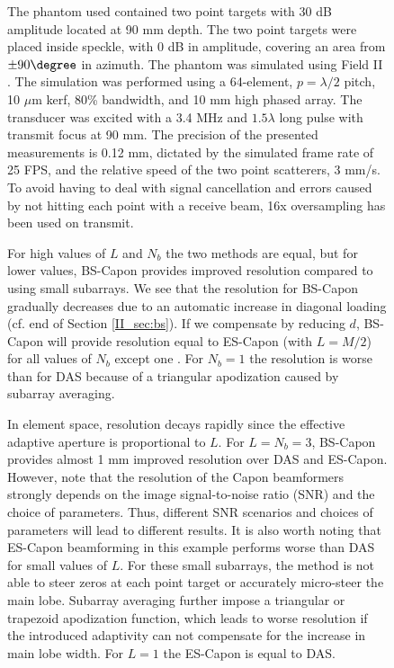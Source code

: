 \begin{figure}[!t]
The phantom used contained two point targets with 30 dB amplitude located at 90 mm depth. The two point targets were placed inside speckle, with 0 dB in amplitude, covering an area from $\pm90\degree$ in azimuth. The phantom was simulated using Field II \cite{Jensen1992, Jensen1996}. The simulation was performed using a 64-element, $p=\lambda/2$ pitch, 10 $\mu$m kerf, 80\% bandwidth, and 10 mm high phased array. The transducer was excited with a 3.4 MHz and $1.5\lambda$ long pulse with transmit focus at 90 mm. The precision of the presented measurements is 0.12 mm, dictated by the simulated frame rate of 25 FPS, and the relative speed of the two point scatterers, 3 mm/s. To avoid having to deal with signal cancellation and errors caused by not hitting each point with a receive beam, 16x oversampling has been used on transmit. 

For high values of $L$ and $N_b$ the two methods are equal, but for lower values, BS-Capon provides improved resolution compared to using small subarrays. We see that the resolution for BS-Capon gradually decreases due to an automatic increase in diagonal loading (cf. end of Section \ref{II_sec:bs}). If we compensate by reducing $d$, BS-Capon will provide resolution equal to ES-Capon (with $L=M/2$) for all values of $N_b$ except one \cite{Nilsen2009}. For $N_b=1$ the resolution is worse than for DAS because of a triangular apodization caused by subarray averaging. 

In element space, resolution decays rapidly since the effective adaptive aperture is proportional to $L$. For $L = N_b=3$, BS-Capon provides almost 1 mm improved resolution over DAS and ES-Capon. However, note that the resolution of the Capon beamformers strongly depends on the image signal-to-noise ratio (SNR) and the choice of parameters. Thus, different SNR scenarios and choices of parameters will lead to different results. It is also worth noting that ES-Capon beamforming in this example performs worse than DAS for small values of $L$. For these small subarrays, the method is not able to steer zeros at each point target or accurately micro-steer the main lobe. Subarray averaging further impose a triangular or trapezoid apodization function, which leads to worse resolution if the introduced adaptivity can not compensate for the increase in main lobe width. For $L=1$ the ES-Capon is equal to DAS.


\end{figure}
